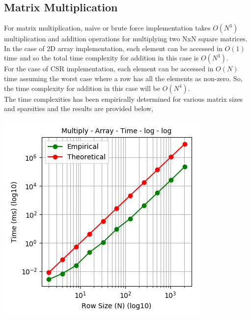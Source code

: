 \documentclass[11pt,a4paper,oneside]{article}
\begin{document}
    \subsection{Matrix Multiplication}
    For matrix multiplication, naive or brute force implementation takes $O(N^3)$ multiplication and addition operations for multiplying two NxN square matrices. \\
    \newline
    In the case of 2D array implementation, each element can be accessed in $O(1)$ time and so the total time complexity for addition in this case is $O(N^3)$. \\
    \newline
    For the case of CSR implementation, each element can be accessed in $O(N)$ time assuming the worst case where a row has all the elements as non-zero. So, the time complexity for addition in this case will be $O(N^4)$. \\   
    \newline    
    The time complexities has been empirically determined for various matrix sizes and sparsities and the results are provided below,
    
     \begin{center}
    	\includegraphics[scale=0.6]{5.png}		
    \end{center}
    
\end{document}
